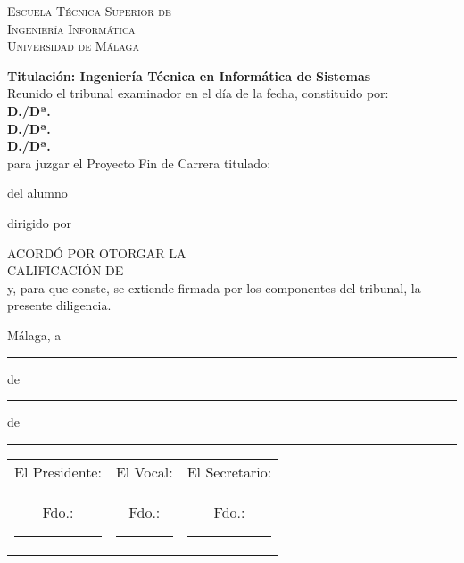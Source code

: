 \thispagestyle{empty}
\begin{center}
  \Large \sffamily \scshape %
  Escuela Técnica Superior de\\
  Ingeniería Informática\\
  Universidad de Málaga
\end{center}

  {\bfseries Titulación: Ingeniería Técnica en Informática de Sistemas}\\[3ex]

  \noindent Reunido el tribunal examinador en el día de la fecha, constituido por:\\[3ex]
  \textbf{D./Dª.~}\hrulefill\\[3ex]
  \textbf{D./Dª.~}\hrulefill\\[3ex]
  \textbf{D./Dª.~}\hrulefill\\[3ex]
  
  para juzgar el Proyecto Fin de Carrera titulado:\noindent 
  
\begin{center}
  \large \bfseries \pfctitlename
\end{center}

\noindent del alumno 

\noindent dirigido por 

\bigskip

  \noindent ACORDÓ POR \hrulefill OTORGAR LA\\[3ex]%
  CALIFICACIÓN DE\hrulefill\\[3ex]
  
  
  \noindent y, para que conste, se extiende firmada por los componentes del tribunal, la presente diligencia.
  
  \bigskip

\hfill Málaga, a \rule{1cm}{0.1mm} de \rule{1cm}{0.1mm} de \rule{0.7cm}{0.1mm}

\vfill

\begin{center}
  \begin{tabular}{ccc}
  El Presidente: & El Vocal: & El Secretario:\\[2cm]
  Fdo.:\rule{3cm}{0.1mm} & Fdo.:\rule{3cm}{0.1mm} & Fdo.:\rule{3cm}{0.1mm}  
  \end{tabular}
\end{center}

\blankpage
